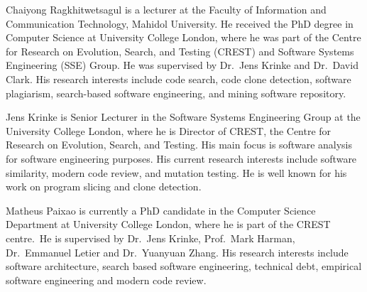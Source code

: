 \documentclass[10pt,journal,compsoc]{IEEEtran}
\begin{document}
\begin{IEEEbiography}{Chaiyong Ragkhitwetsagul}
is a lecturer at the Faculty of Information and Communication Technology, Mahidol University. He received the PhD degree in Computer Science at University College London, where he was part of the Centre for Research on Evolution, Search, and Testing (CREST) and Software Systems Engineering (SSE) Group. He was supervised by Dr.~Jens Krinke and Dr.~David Clark. His research interests include code search, code clone detection, software plagiarism, search-based software engineering, and mining software repository.
\end{IEEEbiography}
\vspace{-1cm}

\begin{IEEEbiography}{Jens Krinke}
is Senior Lecturer in the Software Systems Engineering
Group at the University College London, where he is Director of CREST,
the Centre for Research on Evolution, Search, and Testing.  His main
focus is software analysis for software engineering purposes. His
current research interests include software
similarity, modern code review, and mutation testing.  He is well known for his work on
program slicing and clone detection.
\end{IEEEbiography}
\vspace{-1cm}

\begin{IEEEbiography}{Matheus Paixao}
is currently a PhD candidate in the Computer Science Department at University College London, where he is part of the CREST centre.~He is supervised by Dr.~Jens Krinke, Prof.~Mark Harman, Dr.~Emmanuel Letier and Dr.~Yuanyuan Zhang.
His research interests include software architecture, search based software engineering, technical debt, empirical software engineering and modern code review.
\end{IEEEbiography}
\vspace{-1cm}
\end{document}
